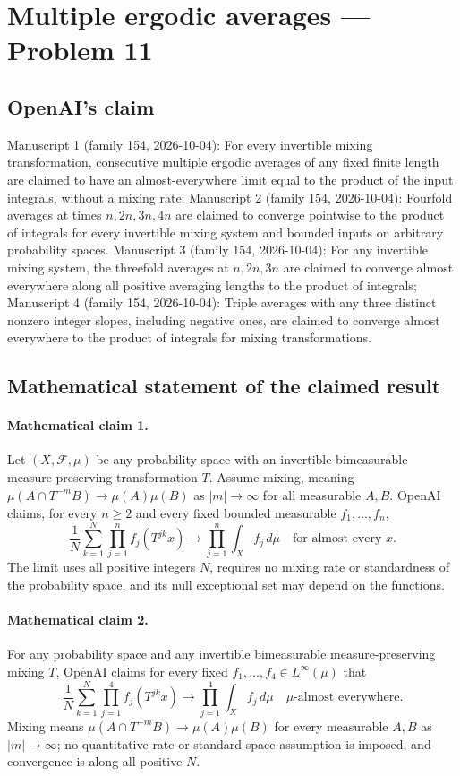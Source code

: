 \documentclass[11pt]{article}
\begin{document}
\section*{Multiple ergodic averages — Problem 11}

\subsection{OpenAI's claim}
Manuscript 1 (family 154, 2026-10-04): For every invertible mixing transformation, consecutive multiple ergodic averages of any fixed finite length are claimed to have an almost-everywhere limit equal to the product of the input integrals, without a mixing rate; Manuscript 2 (family 154, 2026-10-04): Fourfold averages at times $n,2n,3n,4n$ are claimed to converge pointwise to the product of integrals for every invertible mixing system and bounded inputs on arbitrary probability spaces. Manuscript 3 (family 154, 2026-10-04): For any invertible mixing system, the threefold averages at $n,2n,3n$ are claimed to converge almost everywhere along all positive averaging lengths to the product of integrals; Manuscript 4 (family 154, 2026-10-04): Triple averages with any three distinct nonzero integer slopes, including negative ones, are claimed to converge almost everywhere to the product of integrals for mixing transformations.

\subsection{Mathematical statement of the claimed result}
\paragraph{Mathematical claim 1.} Let $(X,\mathcal F,\mu)$ be any probability space with an invertible bimeasurable measure-preserving transformation $T$. Assume mixing, meaning $\mu(A\cap T^{-m}B)\to\mu(A)\mu(B)$ as $|m|\to\infty$ for all measurable $A,B$. OpenAI claims, for every $n\ge2$ and every fixed bounded measurable $f_1,\ldots,f_n$,
\[
\frac1N\sum_{k=1}^N\prod_{j=1}^n f_j(T^{jk}x)\longrightarrow\prod_{j=1}^n\int_X f_j\,d\mu
\quad\text{for almost every }x.
\]
The limit uses all positive integers $N$, requires no mixing rate or standardness of the probability space, and its null exceptional set may depend on the functions.

\paragraph{Mathematical claim 2.} For any probability space and any invertible bimeasurable measure-preserving mixing $T$, OpenAI claims for every fixed $f_1,\ldots,f_4\in L^\infty(\mu)$ that
\[
\frac1N\sum_{k=1}^N\prod_{j=1}^4 f_j(T^{jk}x)\longrightarrow\prod_{j=1}^4\int_X f_j\,d\mu
\quad\mu\text{-almost everywhere}.
\]
Mixing means $\mu(A\cap T^{-m}B)\to\mu(A)\mu(B)$ for every measurable $A,B$ as $|m|\to\infty$; no quantitative rate or standard-space assumption is imposed, and convergence is along all positive $N$.
\end{document}
